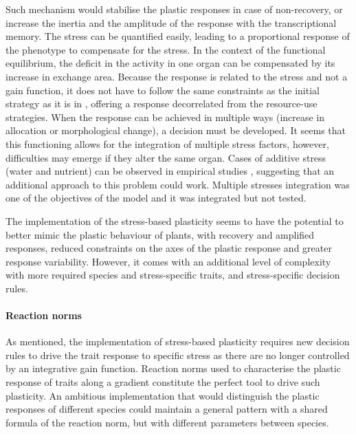 Such mechanism would stabilise the plastic responses in case of non-recovery, or increase the inertia and the amplitude of the response with the transcriptional memory. The stress can be quantified easily, leading to a proportional response of the phenotype to compensate for the stress. In the context of the functional equilibrium, the deficit in the activity in one organ can be compensated by its increase in exchange area. Because the response is related to the stress and not a gain function, it does not have to follow the same constraints as the initial strategy as it is in \model, offering a response decorrelated from the resource-use strategies. When the response can be achieved in multiple ways (increase in allocation or morphological change), a decision must be developed. It seems that this functioning allows for the integration of multiple stress factors, however, difficulties may emerge if they alter the same organ. Cases of additive stress (water and nutrient) can be observed in empirical studies \parencite{fort_root_2015}, suggesting that an additional approach to this problem could work. Multiple stresses integration \cite{pierik_art_2014} was one of the objectives of the model \model and it was integrated but not tested.

The implementation of the stress-based plasticity seems to have the potential to better mimic the plastic behaviour of plants, with recovery and amplified responses, reduced constraints on the axes of the plastic response and greater response variability. However, it comes with an additional level of complexity with more required species and stress-specific traits, and stress-specific decision rules.




\paragraph{Reaction norms}

As mentioned, the implementation of stress-based plasticity requires new decision rules to drive the trait response to specific stress as there are no longer controlled by an integrative gain function. Reaction norms used to characterise the plastic response of traits along a gradient constitute the perfect tool to drive such plasticity. An ambitious implementation that would distinguish the plastic responses of different species could maintain a general pattern with a shared formula of the reaction norm, but with different parameters between species.

